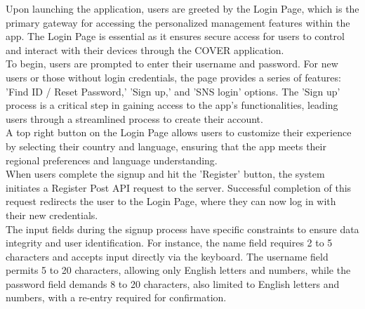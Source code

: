 \documentclass[conference]{IEEEtran}
\begin{document}
\begin{enumerate}[label=\arabic*.]
Upon launching the application, users are greeted by the Login Page, which is the primary gateway for accessing the personalized management features within the app. The Login Page is essential as it ensures secure access for users to control and interact with their devices through the COVER application.\\
To begin, users are prompted to enter their username and password. For new users or those without login credentials, the page provides a series of features: 'Find ID / Reset Password,' 'Sign up,' and 'SNS login' options. The 'Sign up' process is a critical step in gaining access to the app's functionalities, leading users through a streamlined process to create their account.\\
A top right button on the Login Page allows users to customize their experience by selecting their country and language, ensuring that the app meets their regional preferences and language understanding.\\
When users complete the signup and hit the 'Register' button, the system initiates a Register Post API request to the server. Successful completion of this request redirects the user to the Login Page, where they can now log in with their new credentials.\\
The input fields during the signup process have specific constraints to ensure data integrity and user identification. For instance, the name field requires 2 to 5 characters and accepts input directly via the keyboard. The username field permits 5 to 20 characters, allowing only English letters and numbers, while the password field demands 8 to 20 characters, also limited to English letters and numbers, with a re-entry required for confirmation.\\


\end{enumerate}
\end{document}
